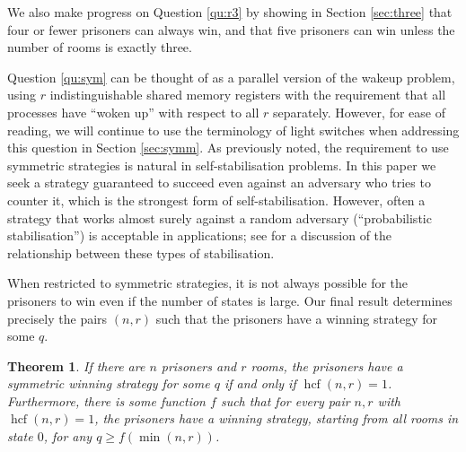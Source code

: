 \documentclass[a4paper,11pt]{extarticle}
\newtheorem{theorem}{Theorem}
\theoremstyle{definition}
\theoremstyle{remark}
\newcommand{\hcf}{\operatorname{hcf}}
\begin{document}
	We also make progress on Question \ref{qu:r3} by showing in Section \ref{sec:three} that four or fewer prisoners can always win, and that five prisoners can win unless the number of rooms is exactly three.
	
	Question \ref{qu:sym} can be thought of as a parallel version of the wakeup problem, using $r$ indistinguishable shared memory registers with the requirement that all processes have ``woken up'' with respect to all $r$ separately. However, for ease of reading, we will continue to use the terminology of light switches when addressing this question in Section \ref{sec:symm}. As previously noted, the requirement to use symmetric strategies is natural in self-stabilisation problems. In this paper we seek a strategy guaranteed to succeed even against an adversary who tries to counter it, which is the strongest form of self-stabilisation. However, often a strategy that works almost surely against a random adversary (``probabilistic stabilisation'') is acceptable in applications; see \cite{DTY15} for a discussion of the relationship between these types of stabilisation. 
	
	When restricted to symmetric strategies, it is not always possible for the prisoners to win even if the number of states is large. Our final result determines precisely the pairs $(n,r)$ such that the prisoners have a winning strategy for some $q$.
	\begin{theorem}\label{thm:coprime}
		If there are $n$ prisoners and $r$ rooms, the prisoners have a symmetric winning strategy for some $q$ if and only if $\hcf(n,r)=1$. Furthermore, there is some function $f$ such that for every pair $n,r$ with $\hcf(n,r)=1$, the prisoners have a winning strategy, starting from all rooms in state $0$, for any $q\geq f(\min(n,r))$.
	\end{theorem}
	
\end{document}
